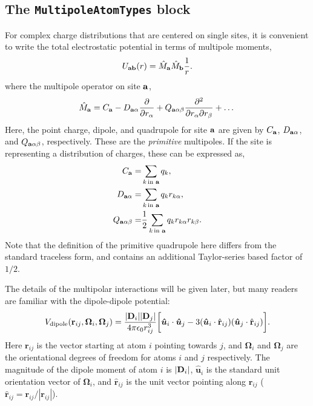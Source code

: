 \documentclass[letterpaper]{report}
\begin{document}
\subsection{\label{section:ffMultipole}The {\tt MultipoleAtomTypes}
  block}
For complex charge distributions that are centered on single sites, it
is convenient to write the total electrostatic potential in terms of
multipole moments,
\begin{equation}
U_{\bf{ab}}(r)=\hat{M}_{\bf a} \hat{M}_{\bf b} \frac{1}{r}  \label{kernel}.
\end{equation}
where the multipole operator on site $\bf a$,
\begin{equation}
\hat{M}_{\bf a} = C_{\bf a} - D_{{\bf a}\alpha} \frac{\partial}{\partial r_{\alpha}} 
+  Q_{{\bf a}\alpha\beta}
 \frac{\partial^2}{\partial r_{\alpha} \partial r_{\beta}} + \dots
\end{equation}
Here, the point charge, dipole, and quadrupole for site $\bf a$ are
given by $C_{\bf a}$, $D_{{\bf a}\alpha}$, and $Q_{{\bf
    a}\alpha\beta}$, respectively.  These are the {\it primitive}
multipoles.  If the site is representing a distribution of charges,
these can be expressed as,
\begin{align}
C_{\bf a} =&\sum_{k \, \text{in \bf a}} q_k , \label{eq:charge} \\
D_{{\bf a}\alpha} =&\sum_{k \, \text{in \bf a}} q_k r_{k\alpha}, \label{eq:dipole}\\
Q_{{\bf a}\alpha\beta} =& \frac{1}{2} \sum_{k \, \text{in \bf a}} q_k
r_{k\alpha}  r_{k\beta} . \label{eq:quadrupole}
\end{align}
Note that the definition of the primitive quadrupole here differs from
the standard traceless form, and contains an additional Taylor-series
based factor of $1/2$.  

The details of the multipolar interactions will be given later, but
many readers are familiar with the dipole-dipole potential:
\begin{equation}
V_{\text{dipole}}(\mathbf{r}_{ij},\boldsymbol{\Omega}_{i},
	\boldsymbol{\Omega}_{j}) = \frac{|{\bf D}_i||{\bf D}_j|}{4\pi\epsilon_{0}r_{ij}^{3}} \biggl[
	\boldsymbol{\hat{u}}_{i} \cdot \boldsymbol{\hat{u}}_{j}
	-
	3(\boldsymbol{\hat{u}}_i \cdot \hat{\mathbf{r}}_{ij}) %
		(\boldsymbol{\hat{u}}_j \cdot \hat{\mathbf{r}}_{ij}) \biggr].
\label{eq:dipolePot}
\end{equation}
Here $\mathbf{r}_{ij}$ is the vector starting at atom $i$ pointing
towards $j$, and $\boldsymbol{\Omega}_i$ and $\boldsymbol{\Omega}_j$
are the orientational degrees of freedom for atoms $i$ and $j$
respectively. The magnitude of the dipole moment of atom $i$ is $|{\bf
  D}_i|$, $\boldsymbol{\hat{u}}_i$ is the standard unit orientation
vector of $\boldsymbol{\Omega}_i$, and $\boldsymbol{\hat{r}}_{ij}$ is
the unit vector pointing along $\mathbf{r}_{ij}$
($\boldsymbol{\hat{r}}_{ij}=\mathbf{r}_{ij}/|\mathbf{r}_{ij}|$).
\end{document}
